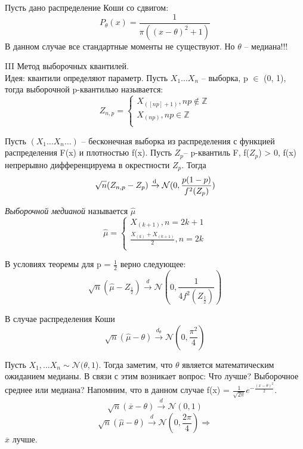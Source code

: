 \begin{example}
Пусть дано распределение Коши со сдвигом:
$$
P_\theta(x) = \frac{1}{\pi((x - \theta)^2 + 1)}
$$
В данном случае все стандартные моменты не существуют. Но $\theta$ -- медиана!!!
\end{example}

III Метод выборочных квантилей.\\
Идея: квантили определяют параметр.
Пусть $X_1 \ldots X_n$ -- выборка, p $\in$ (0, 1), тогда выборочной p-квантилью называется:
$$Z_{n,p} =
\begin{cases}
X_{([np] + 1)}, np \notin \mathbb{Z} \\
X_{(np)}, np \in \mathbb{Z} \\
\end{cases}
$$

\begin{theorem}
Пусть $(X_1 \ldots X_n \ldots)$ -- бесконечная выборка из распределения с функцией распределения F(x) и плотностью f(x). Пусть $Z_p$-- p-квантиль F, f($Z_p$) > 0, f(x) непрерывно дифференцируема в окрестности $Z_p$. Тогда
$$
\sqrt{n}(Z_{n,p} - Z_p) \xrightarrow{\mathrm{d}} \mathcal{N}(0, \frac{p(1 - p)}{f^2(Z_p)})
$$
\end{theorem}

\begin{definition}
\emph{Выборочной медианой} называется $\hat{\mu}$
$$\hat{\mu} =
\begin{cases}
X_{(k + 1)}, n = 2k + 1 \\
\frac{X_{(k)} + X_{(k + 1)}}{2}, n = 2k \\
\end{cases}
$$
\end{definition}

\begin{proposition}
В условиях теоремы для p = $\frac{1}{2}$ верно следующее:
$$
\sqrt{n}(\hat{\mu} - Z_{\frac{1}{2}}) \overset{d}{\to} \mathcal{N}(0, \frac{1}{4f^2(Z_{\frac{1}{2}})})
$$
\end{proposition}

\begin{example}
В случае распределения Коши
$$
\sqrt{n}(\hat{\mu} - \theta) \overset{d_\theta}{\to} \mathcal{N}(0, \frac{\pi^2}{4})
$$
\end{example}

\begin{example}
Пусть $X_1, \ldots X_n \sim \mathcal{N}(\theta, 1$). Тогда заметим, что $\theta$ является математическим ожиданием медианы. В связи с этим возникает вопрос: Что лучше? Выборочное среднее или медиана? Напомним, что в данном случае f(x) = $\frac{1}{\sqrt{2\pi}}e^{-\frac{(x - \theta)^2}{2}}$.
$$
\sqrt{n}(\overline{x} - \theta) \overset{d}{\to} \mathcal{N}(0, 1)
$$
$$
\sqrt{n}(\hat{\mu} - \theta) \overset{d}{\to} \mathcal{N}(0, \frac{2\pi}{4}) \Rightarrow
$$
$\overline{x}$ лучше.
\end{example}

